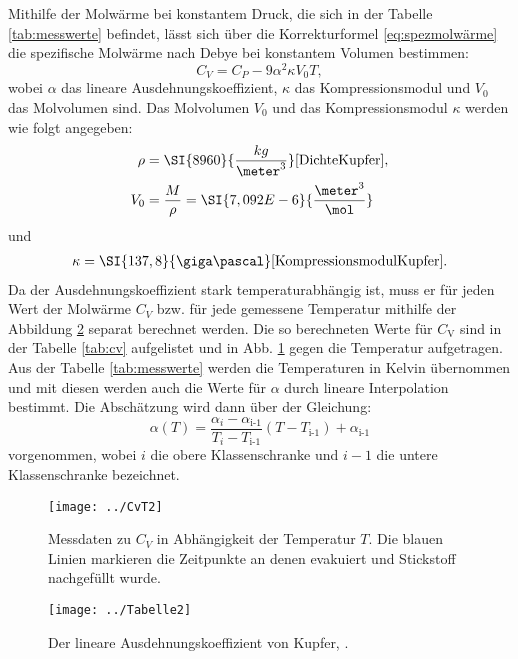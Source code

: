 Mithilfe der Molwärme bei konstantem Druck, die sich in der Tabelle \ref{tab:messwerte} befindet, lässt sich über die Korrekturformel \ref{eq:spezmolwärme} die spezifische Molwärme nach Debye bei konstantem Volumen bestimmen:
\begin{equation}
\label{eq:spezmolwärme}
C_V = C_P - 9\alpha^2\kappa V_0 T,
\end{equation}
wobei $\alpha$ das lineare Ausdehnungskoeffizient, $\kappa$ das Kompressionsmodul und $V_0$ das Molvolumen sind. 
Das Molvolumen $V_0$ und das Kompressionsmodul $\kappa$ werden wie folgt angegeben:
\begin{align*}
\rho &= \SI{8960}{\frac{kg}{\meter^3}} \text{\cite{DichteKupfer}},\\
V_0  &= \frac{M}{\rho} = \SI{7,092E-6}{\frac{\meter^3}{\mol}}
\end{align*}
und 
\begin{align*}
\kappa = \SI{137,8}{\giga\pascal} \text{\cite{KompressionsmodulKupfer}.}
\end{align*}
Da der Ausdehnungskoeffizient stark temperaturabhängig ist, muss er für jeden Wert der Molwärme $C_V$ bzw. für jede gemessene Temperatur mithilfe der Abbildung \ref{fig:tabelle2} separat berechnet werden. Die so berechneten Werte für $C_\text{V}$ sind in der Tabelle \ref{tab:cv} aufgelistet und in Abb. \ref{fig:cvt2} gegen die Temperatur aufgetragen. Aus der Tabelle \ref{tab:messwerte} werden die Temperaturen in Kelvin übernommen und mit diesen werden auch die Werte für $\alpha$ durch lineare Interpolation bestimmt. Die Abschätzung wird dann über der Gleichung:
\begin{equation}
\alpha(T) = \frac{\alpha_i - \alpha_\text{i-1}}{T_i - T_\text{i-1}}(T - T_\text{i-1}) + \alpha_\text{i-1}
\end{equation}
vorgenommen, wobei $i$ die obere Klassenschranke und $i-1$ die untere Klassenschranke bezeichnet.

\begin{figure}[h!]
	\centering
	\texttt{[image: ../CvT2]}
	\caption{Messdaten zu $C_V$ in Abhängigkeit der Temperatur $T$. Die blauen Linien markieren die Zeitpunkte an denen evakuiert und Stickstoff nachgefüllt wurde.}
	\label{fig:cvt2}
\end{figure}

\begin{figure}[h!]
	\centering
	\texttt{[image: ../Tabelle2]}
	\caption{Der lineare Ausdehnungskoeffizient von Kupfer, \cite[5]{anleitungV47}.}
	\label{fig:tabelle2}
\end{figure}

